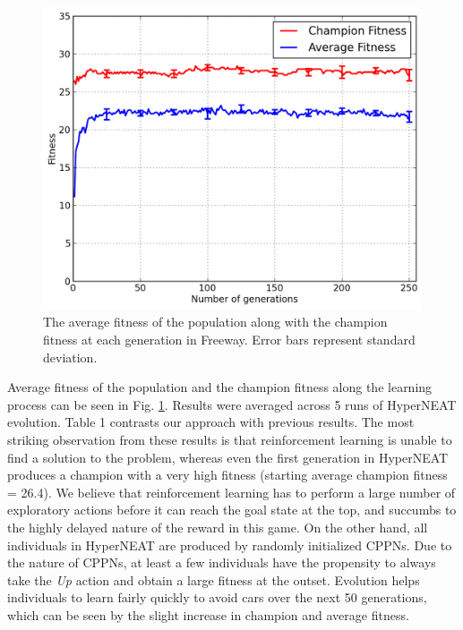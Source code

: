 \documentclass{acm_proc_article-sp}
\begin{document}
\begin{figure}[ht]
\begin{center}
\includegraphics[width=\columnwidth]{figures/freeway-results.png}
\end{center}
\caption{The average fitness of the population along with the champion fitness at each generation in Freeway. Error bars represent standard deviation.}
\label{fig:freeway-curve}
\end{figure}

Average fitness of the population and the champion fitness along the learning process can be seen in Fig. \ref{fig:freeway-curve}. Results were averaged across 5 runs of HyperNEAT evolution. Table 1 contrasts our approach with previous results. The most striking observation from these results is that reinforcement learning is unable to find a solution to the problem, whereas even the first generation in HyperNEAT produces a champion with a very high fitness (starting average champion fitness = 26.4). We believe that reinforcement learning has to perform a large number of exploratory actions before it can reach the goal state at the top, and succumbs to the highly delayed nature of the reward in this game. On the other hand, all individuals in HyperNEAT are produced by randomly initialized CPPNs. Due to the nature of CPPNs, at least a few individuals have the propensity to always take the \textit{Up} action and obtain a large fitness at the outset. Evolution helps individuals to learn fairly quickly to avoid cars over the next 50 generations, which can be seen by the slight increase in champion and average fitness.
\end{document}
